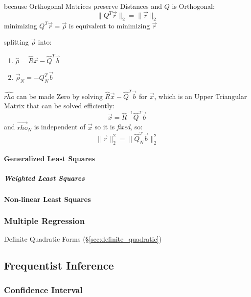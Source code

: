 because Orthogonal Matrices preserve Distances and $Q$ is Orthogonal:
\[
  \|Q^T\vec{r}\|_2 = \|\vec{r}\|_2
\]
minimizing $Q^T\vec{r} = \vec{\rho}$ is equivalent to minimizing $\vec{r}$

splitting $\vec{\rho}$ into:
\begin{enumerate}
  \item $\hat{\rho}   = \hat{R}\vec{x} - \hat{Q}^T\vec{b}$
  \item $\vec{\rho}_N = -Q_N^T\vec{b}$
\end{enumerate}
$\hat{rho}$ can be made Zero by solving $\hat{R}\vec{x} - \hat{Q}^T\vec{b}$ for
$\vec{x}$, which is an Upper Triangular Matrix that can be solved efficiently:
\[
  \vec{x} = \hat{R}^{-1}\hat{Q}^T\vec{b}
\]
and $\vec{rho}_N$ is independent of $\vec{x}$ so it is \emph{fixed}, so:
\[
  \|\vec{r}\|^2_2 = \|\hat{Q}_N^T\vec{b}\|_2^2
\]



\paragraph{Generalized Least Squares}\label{sec:generalized_least_squares}\hfill

\subparagraph{Weighted Least Squares}\label{sec:weighted_least_squares}\hfill



\paragraph{Non-linear Least Squares}\label{sec:nonlinear_least_squares}\hfill



\subsubsection{Multiple Regression}\label{sec:multiple_regression}

Definite Quadratic Forms (\S\ref{sec:definite_quadratic})



\subsection{Frequentist Inference}\label{sec:frequentist_inference}

\subsubsection{Confidence Interval}\label{sec:confidence_interval}

